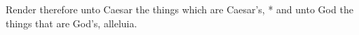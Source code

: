 Render therefore unto Caesar the things which are Caesar's, * and unto God the things that are God's, alleluia.
